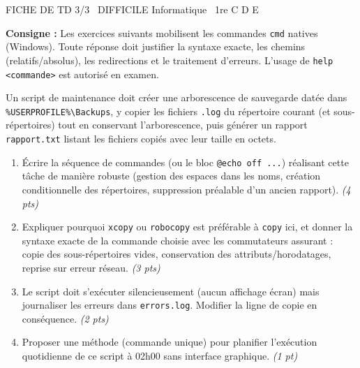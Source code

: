 \documentclass[11pt]{article}
\begin{document}
\begin{tcolorbox}[enhanced,colback=popink,colframe=popink,arc=10pt,boxrule=0pt,left=12pt,right=12pt,top=9pt,bottom=9pt]
{\color{white}\popxbold\small FICHE DE TD 3/3 \textbullet\ DIFFICILE \hfill Informatique \textbullet\ 1re C D E\par}
\end{tcolorbox}
\vspace{4pt}
\noindent\textbf{Consigne :} Les exercices suivants mobilisent les commandes \texttt{cmd} natives (Windows). Toute réponse doit justifier la syntaxe exacte, les chemins (relatifs/absolus), les redirections et le traitement d'erreurs. L'usage de \texttt{help <commande>} est autorisé en examen.

\begin{exercice}
Un script de maintenance doit créer une arborescence de sauvegarde datée dans \texttt{\%USERPROFILE\%\textbackslash Backups}, y copier les fichiers \texttt{.log} du répertoire courant (et sous-répertoires) tout en conservant l'arborescence, puis générer un rapport \texttt{rapport.txt} listant les fichiers copiés avec leur taille en octets.
\begin{enumerate}
    \item Écrire la séquence de commandes (ou le bloc \texttt{@echo off ...}) réalisant cette tâche de manière robuste (gestion des espaces dans les noms, création conditionnelle des répertoires, suppression préalable d'un ancien rapport). \textit{(4 pts)}
    \item Expliquer pourquoi \texttt{xcopy} ou \texttt{robocopy} est préférable à \texttt{copy} ici, et donner la syntaxe exacte de la commande choisie avec les commutateurs assurant : copie des sous-répertoires vides, conservation des attributs/horodatages, reprise sur erreur réseau. \textit{(3 pts)}
    \item Le script doit s'exécuter silencieusement (aucun affichage écran) mais journaliser les erreurs dans \texttt{errors.log}. Modifier la ligne de copie en conséquence. \textit{(2 pts)}
    \item Proposer une méthode (commande unique) pour planifier l'exécution quotidienne de ce script à 02h00 sans interface graphique. \textit{(1 pt)}
\end{enumerate}
\end{exercice}
\end{document}
